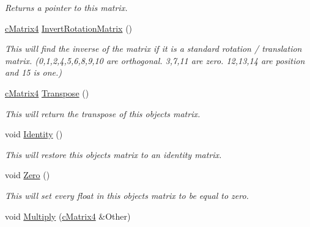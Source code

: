 \begin{DoxyCompactItemize}
\begin{DoxyCompactList}\small\item\em Returns a pointer to this matrix. \end{DoxyCompactList}\item 
\hypertarget{classc_matrix4_a7473299a57ffcfe284e6fd9005b98592}{
\hyperlink{classc_matrix4}{cMatrix4} \hyperlink{classc_matrix4_a7473299a57ffcfe284e6fd9005b98592}{InvertRotationMatrix} ()}
\label{classc_matrix4_a7473299a57ffcfe284e6fd9005b98592}

\begin{DoxyCompactList}\small\item\em This will find the inverse of the matrix if it is a standard rotation / translation matrix. (0,1,2,4,5,6,8,9,10 are orthogonal. 3,7,11 are zero. 12,13,14 are position and 15 is one.) \end{DoxyCompactList}\item 
\hypertarget{classc_matrix4_ac8b6f1a9352943cd86ef4c088c438307}{
\hyperlink{classc_matrix4}{cMatrix4} \hyperlink{classc_matrix4_ac8b6f1a9352943cd86ef4c088c438307}{Transpose} ()}
\label{classc_matrix4_ac8b6f1a9352943cd86ef4c088c438307}

\begin{DoxyCompactList}\small\item\em This will return the transpose of this objects matrix. \end{DoxyCompactList}\item 
\hypertarget{classc_matrix4_a6aa4f58a001499cd666f9d65f3a821a0}{
void \hyperlink{classc_matrix4_a6aa4f58a001499cd666f9d65f3a821a0}{Identity} ()}
\label{classc_matrix4_a6aa4f58a001499cd666f9d65f3a821a0}

\begin{DoxyCompactList}\small\item\em This will restore this objects matrix to an identity matrix. \end{DoxyCompactList}\item 
\hypertarget{classc_matrix4_acf16f37d849137d2e410ec20f2b4e74d}{
void \hyperlink{classc_matrix4_acf16f37d849137d2e410ec20f2b4e74d}{Zero} ()}
\label{classc_matrix4_acf16f37d849137d2e410ec20f2b4e74d}

\begin{DoxyCompactList}\small\item\em This will set every float in this objects matrix to be equal to zero. \end{DoxyCompactList}\item 
\hypertarget{classc_matrix4_afc8fe82a6dfb40e77abc3117d10c18e5}{
void \hyperlink{classc_matrix4_afc8fe82a6dfb40e77abc3117d10c18e5}{Multiply} (\hyperlink{classc_matrix4}{cMatrix4} \&Other)}
\label{classc_matrix4_afc8fe82a6dfb40e77abc3117d10c18e5}


\end{DoxyCompactItemize}
